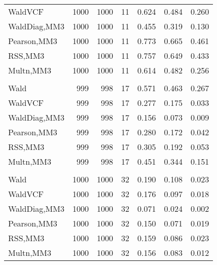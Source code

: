 \documentclass[
]{article}
\begin{document}
\begin{table}[H]
{\begin{tabular}[t]{lrrrrrr}
\hspace{1em}WaldVCF & 1000 & 1000 & 11 & 0.624 & 0.484 & 0.260\\
\hspace{1em}WaldDiag,MM3 & 1000 & 1000 & 11 & 0.455 & 0.319 & 0.130\\
\hspace{1em}Pearson,MM3 & 1000 & 1000 & 11 & 0.773 & 0.665 & 0.461\\
\hspace{1em}RSS,MM3 & 1000 & 1000 & 11 & 0.757 & 0.649 & 0.433\\
\hspace{1em}Multn,MM3 & 1000 & 1000 & 11 & 0.614 & 0.482 & 0.256\\
\addlinespace[0.3em]
\multicolumn{7}{l}{\textbf{2F 10V}}\\
\hspace{1em}Wald & 999 & 998 & 17 & 0.571 & 0.463 & 0.267\\
\hspace{1em}WaldVCF & 999 & 998 & 17 & 0.277 & 0.175 & 0.033\\
\hspace{1em}WaldDiag,MM3 & 999 & 998 & 17 & 0.156 & 0.073 & 0.009\\
\hspace{1em}Pearson,MM3 & 999 & 998 & 17 & 0.280 & 0.172 & 0.042\\
\hspace{1em}RSS,MM3 & 999 & 998 & 17 & 0.305 & 0.192 & 0.053\\
\hspace{1em}Multn,MM3 & 999 & 998 & 17 & 0.451 & 0.344 & 0.151\\
\addlinespace[0.3em]
\multicolumn{7}{l}{\textbf{3F 15V}}\\
\hspace{1em}Wald & 1000 & 1000 & 32 & 0.190 & 0.108 & 0.023\\
\hspace{1em}WaldVCF & 1000 & 1000 & 32 & 0.176 & 0.097 & 0.018\\
\hspace{1em}WaldDiag,MM3 & 1000 & 1000 & 32 & 0.071 & 0.024 & 0.002\\
\hspace{1em}Pearson,MM3 & 1000 & 1000 & 32 & 0.150 & 0.071 & 0.019\\
\hspace{1em}RSS,MM3 & 1000 & 1000 & 32 & 0.159 & 0.086 & 0.023\\
\hspace{1em}Multn,MM3 & 1000 & 1000 & 32 & 0.156 & 0.083 & 0.012\\
\bottomrule
\end{tabular}}
\endgroup{}
\end{table}
\end{document}
